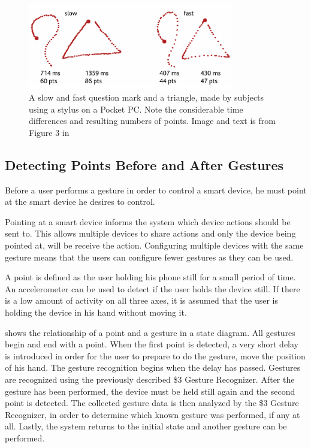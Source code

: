 \begin{figure}[!htb]
  \centering
  \includegraphics[width=0.8\textwidth]{images/1-dollar-gesturetrace.png}
  \caption{A slow and fast question mark and a triangle, made by subjects using a stylus on a Pocket PC. Note the considerable time differences and resulting numbers of points. Image and text is from Figure 3 in \cite{wobbrock2007gestures}}
  \label{fig:onedollar-gesturetrace}
\end{figure}

\subsection{Detecting Points Before and After Gestures}
Before a user performs a gesture in order to control a smart device, 
he must point at the smart device he desires to control. 

Pointing at a smart device informs the system which device actions should be sent to. This allows multiple devices to share actions and only the device being pointed at, will be receive the action. Configuring multiple devices with the same gesture means that the users can configure fewer gestures as they can be used.

A point is defined as the user holding his phone still for a small period of time. 
An accelerometer can be used to detect if the user holds the device still. 
If there is a low amount of activity on all three axes, 
it is assumed that the user is holding the device in his hand without moving it.

 shows the relationship of a point and a gesture in a state diagram. 
All gestures begin and end with a point. 
When the first point is detected, 
a very short delay is introduced in order for the user to prepare to do the gesture, 
\eg move the position of his hand. 
The gesture recognition begins when the delay has passed. 
Gestures are recognized using the previously described \$3 Gesture Recognizer. 
After the gesture has been performed, 
the device must be held still again and the second point is detected. 
The collected gesture data is then analyzed by the \$3 Gesture Recognizer, 
in order to determine which known gesture was performed, if any at all. 
Lastly, the system returns to the initial state and another gesture can be performed.

